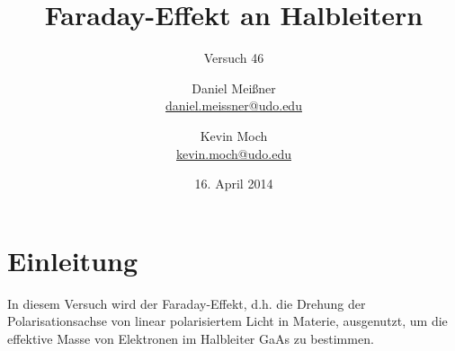 

\newcommand{\name}[1]{\textsc{#1}}
\newcommand{\pdn}[3]{%
\ensuremath{\frac{\partial^{#1} #2}{\partial #3^{#1}}}}
\newcommand{\pd}[2]{%
\ensuremath{\frac{\partial #1}{\partial #2}}}
\renewcommand{\d}{\ensuremath{\mathrm{d}}}
\newcommand{\iunt}{\ensuremath{\mathrm{i}}} %

\titlehead{{TU Dortmund \hfill WS~14\\}
Fakultät Physik\\ Fortgeschrittenenpraktikum}

\subject{Versuchsprotokoll}
\title{Faraday-Effekt an Halbleitern}
\subtitle{Versuch 46}

\author{Daniel Meißner\\
{\normalsize\url{daniel.meissner@udo.edu}}
\and
Kevin Moch\\
{\normalsize\url{kevin.moch@udo.edu}}}

\date{16. April 2014}


\maketitle

\tableofcontents
\clearpage

\section{Einleitung}

In diesem Versuch wird der Faraday-Effekt, d.h. die Drehung der 
Polarisationsachse von linear polarisiertem Licht in Materie, 
ausgenutzt, um die effektive Masse von Elektronen im Halbleiter 
GaAs zu bestimmen. 

\FloatBarrier






\printbibliography
\nocite{v046}

\theappendix


